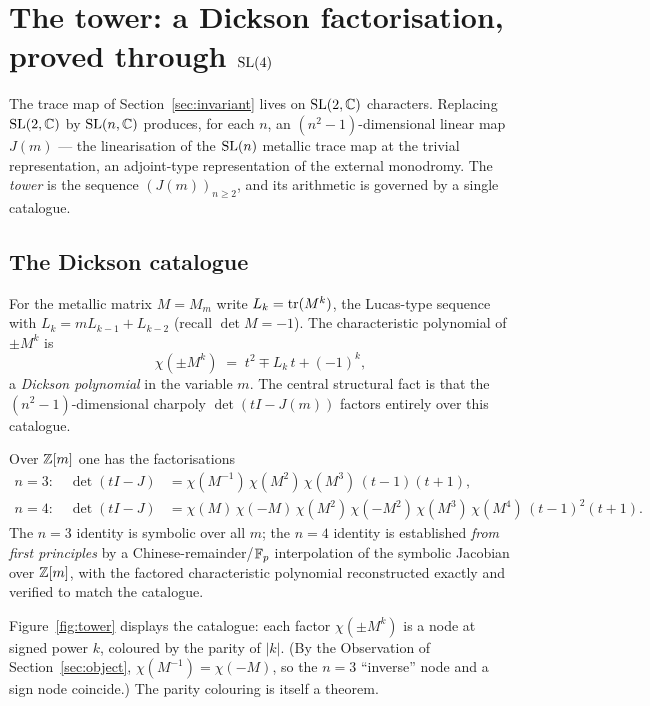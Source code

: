\section{The tower: a Dickson factorisation, proved through $\mathrm{SL}(4)$}
\label{sec:tower}

The trace map of Section~\ref{sec:invariant} lives on $\mathrm{SL}(2,\mathbb{C})$ characters. Replacing
$\mathrm{SL}(2,\mathbb{C})$ by $\mathrm{SL}(n,\mathbb{C})$ produces, for each $n$, an $(n^2-1)$-dimensional linear map
$J(m)$ --- the linearisation of the $\mathrm{SL}(n)$ metallic trace map at the trivial
representation, an adjoint-type representation of the external monodromy. The
\emph{tower} is the sequence $(J(m))_{n\ge2}$, and its arithmetic is governed by a single
catalogue.

\subsection{The Dickson catalogue}

For the metallic matrix $M=M_m$ write $L_k=\operatorname{tr}(M^k)$, the Lucas-type sequence with
$L_k=mL_{k-1}+L_{k-2}$ (recall $\det M=-1$). The characteristic polynomial of $\pm M^k$
is
\begin{equation}
  \chi(\pm M^k) \;=\; t^2 \mp L_k\,t + (-1)^k,
\end{equation}
a \emph{Dickson polynomial} in the variable $m$. The central structural fact is that the
$(n^2-1)$-dimensional charpoly $\det(tI-J(m))$ factors entirely over this catalogue.

\begin{theorem}[\sExact, \sProved]\label{thm:tower}
Over $\mathbb{Z}[m]$ one has the factorisations
\begin{align}
  n=3:\quad \det(tI-J) &= \chi(M^{-1})\,\chi(M^2)\,\chi(M^3)\,(t-1)(t+1),\\
  n=4:\quad \det(tI-J) &= \chi(M)\,\chi(-M)\,\chi(M^2)\,\chi(-M^2)\,\chi(M^3)\,\chi(M^4)\,(t-1)^2(t+1).
\end{align}
The $n=3$ identity is symbolic over all $m$; the $n=4$ identity is established
\emph{from first principles} by a Chinese-remainder/$\mathbb{F}_p$ interpolation of the symbolic
Jacobian over $\mathbb{Z}[m]$, with the factored characteristic polynomial reconstructed exactly
and verified to match the catalogue.
\end{theorem}

Figure~\ref{fig:tower} displays the catalogue: each factor $\chi(\pm M^k)$ is a node at
signed power $k$, coloured by the parity of $|k|$. (By the Observation of
Section~\ref{sec:object}, $\chi(M^{-1})=\chi(-M)$, so the $n=3$ ``inverse'' node and a
sign node coincide.) The parity colouring is itself a theorem.


